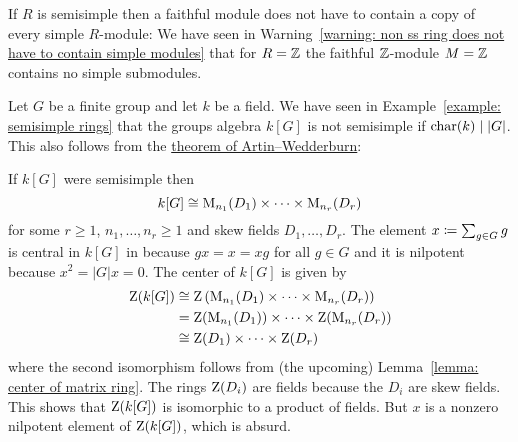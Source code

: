 \begin{warning}
  If $R$ is semisimple then a faithful module does not have to contain a copy of every simple $R$-module:
  We have seen in Warning~\ref{warning: non ss ring does not have to contain simple modules} that for $R = \mathbb{Z}$ the faithful $\mathbb{Z}$-module $M = \mathbb{Z}$ contains no simple submodules.
\end{warning}


\begin{remark}
  Let $G$ be a finite group and let $k$ be a field.
  We have seen in Example~\ref{example: semisimple rings} that the groups algebra $k[G]$ is not semisimple if $\operatorname{char}(k) \mid |G|$.
  This also follows from the \hyperref[theorem: artin wedderburn theorem]{theorem of Artin--Wedderburn}:
  
  If $k[G]$ were semisimple then
  \[
          k[G]
    \cong \operatorname{M}_{n_1}(D_1) \times \dotsb \times \operatorname{M}_{n_r}(D_r)
  \]
  for some $r \geq 1$, $n_1, \dotsc, n_r \geq 1$ and skew fields $D_1, \dotsc, D_r$.
  The element $x \coloneqq \sum_{g \in G} g$ is central in $k[G]$ in because $g x = x = x g$ for all $g \in G$ and it is nilpotent because $x^2 = |G| x = 0$.
  The center of $k[G]$ is given by
  \begin{align*}
            \operatorname{Z}(k[G])
    &\cong  \operatorname{Z}\left( \operatorname{M}_{n_1}(D_1) \times \dotsb \times \operatorname{M}_{n_r}(D_r) \right)  \\
    &=      \operatorname{Z}(\operatorname{M}_{n_1}(D_1)) \times \dotsb \times \operatorname{Z}(\operatorname{M}_{n_r}(D_r))  \\
    &\cong  \operatorname{Z}(D_1) \times \dotsb \times \operatorname{Z}(D_r)
  \end{align*}
  where the second isomorphism follows from (the upcoming) Lemma~\ref{lemma: center of matrix ring}.
  The rings $\operatorname{Z}(D_i)$ are fields because the $D_i$ are skew fields.
  This shows that $\operatorname{Z}(k[G])$ is isomorphic to a product of fields.
  But $x$ is a nonzero nilpotent element of $\operatorname{Z}(k[G])$, which is absurd.
\end{remark}




